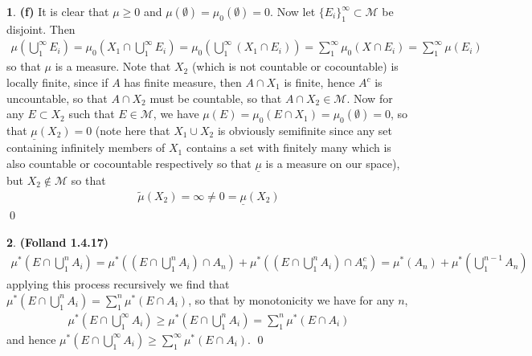 \documentclass[10.5pt]{article}
\theoremstyle{definition}
\newtheorem{pb}{}
\newcommand{\set}[1]{\{#1\}}
\begin{document}
\begin{pb}
        \textbf{(f)} It is clear that \(\mu \geq 0\) and \(\mu(\emptyset) = \mu_0(\emptyset) = 0\). Now let \(\set{E_i}_1^\infty \subset \mathcal{M}\) be disjoint. Then
        \begin{align*}
            \mu(\bigcup_1^\infty E_i) = \mu_0(X_1 \cap \bigcup_1^\infty E_i) = \mu_0(\bigcup_1^\infty(X_1 \cap E_i)) = \sum_1^\infty \mu_0(X \cap E_i) = \sum_1^\infty \mu(E_i)
        \end{align*}
        so that \(\mu\) is a measure. Note that \(X_2\) (which is not countable or cocountable) is locally finite, since if \(A\) has finite measure, then \(A \cap X_1\) is finite, hence \(A^c\) is uncountable, so that \(A \cap X_2\) must be countable, so that \(A \cap X_2 \in \mathcal{M}\). Now for any \(E \subset X_2\) such that \(E \in \mathcal{M}\), we have \(\mu(E) = \mu_0(E \cap X_1) = \mu_0(\emptyset) = 0\), so that \(\underline{\mu}(X_2) = 0\) (note here that \(X_1\cup X_2\) is obviously semifinite since any set containing infinitely members of \(X_1\) contains a set with finitely many which is also countable or cocountable respectively so that \(\underline{\mu}\) is a measure on our space), but \(X_2 \not \in \mathcal{M}\) so that
        \begin{align*}
            \tilde{\mu}(X_2) = \infty \neq 0 = \underline{\mu}(X_2)
        \end{align*} \qed
    \end{pb}
    \begin{pb}\textbf{(Folland 1.4.17)}
        \begin{align*}
            \mu^*(E\cap\bigcup_1^nA_i) = \mu^*\left((E\cap\bigcup_1^nA_i)\cap A_n\right) + \mu^*\left((E\cap\bigcup_1^nA_i)\cap A_n^c\right) = \mu^*(A_n) + \mu^*(\bigcup_1^{n-1} A_n)
        \end{align*}
        applying this process recursively we find that \(\mu^*(E\cap\bigcup_1^nA_i) = \sum_1^n \mu^*(E\cap A_i)\), so that by monotonicity we have for any \(n\),
        \begin{align*}
            \mu^*(E\cap\bigcup_1^\infty A_i) \geq \mu^*(E\cap\bigcup_1^nA_i) = \sum_1^n \mu^* (E \cap A_i)
        \end{align*}
        and hence \(\mu^*(E\cap\bigcup_1^\infty A_i) \geq \sum_1^\infty \mu^* (E \cap A_i)\). \qed
    \end{pb}
\end{document}

